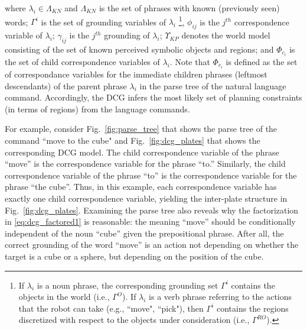 where $\lambda_i \in \Lambda_{KN}$ and $\Lambda_{KN}$ is the set of phrases with known (previously seen) words; $\Gamma^i$ is the set of grounding variables of $\lambda_i$ \footnote{If $\lambda_i$ is a noun phrase, the corresponding grounding set $\Gamma^i$ contains the objects in the world (i.e., $\Gamma^O$). If $\lambda_i$ is a verb phrase referring to the actions that the robot can take (e.g., ``move", ``pick"), then $\Gamma^i$ contains the regions discretized with respect to the objects under consideration (i.e., $\Gamma^{RO}$).}, $\phi_{ij}$ is the $j^{th}$ correspondence variable of $\lambda_i$; $\gamma_{ij}$ is the $j^{th}$ grounding of $\lambda_i$; $\Upsilon_{KP}$ denotes the world model consisting of the set of known perceived symbolic objects and regions; and  $\Phi_{c_{i}}$ is the set of child correspondence variables of $\lambda_{i}$. Note that $\Phi_{c_{i}}$ is defined as the set of correspondance variables for the immediate children phrases (leftmost descendants) of the parent phrase $\lambda_i$ in the parse tree of the natural language command. Accordingly, the DCG infers the most likely set of planning constraints (in terms of regions) from the language commands.

For example, consider Fig.~\ref{fig:parse_tree} that shows the parse tree of the command ``move to the cube" and Fig.~\ref{fig:dcg_plates} that shows the corresponding DCG model. The child correspondence variable of the phrase ``move'' is the correspondence variable for the phrase ``to.'' Similarly, the child correspondence variable of the phrase ``to'' is the correspondence variable for the phrase ``the cube''. Thus, in this example, each correspondence variable has exactly one child correspondence variable, yielding the inter-plate structure in Fig.~\ref{fig:dcg_plates}.
Examining the parse tree also reveals why the factorization in \eqref{eq:dcg_factored1} is reasonable: the meaning ``move'' should be conditionally independent of the noun ``cube'' given the prepositional phrase.
After all, the correct grounding of the word ``move'' is an action not depending on whether the target is a cube or a sphere, but depending on the position of the cube.

